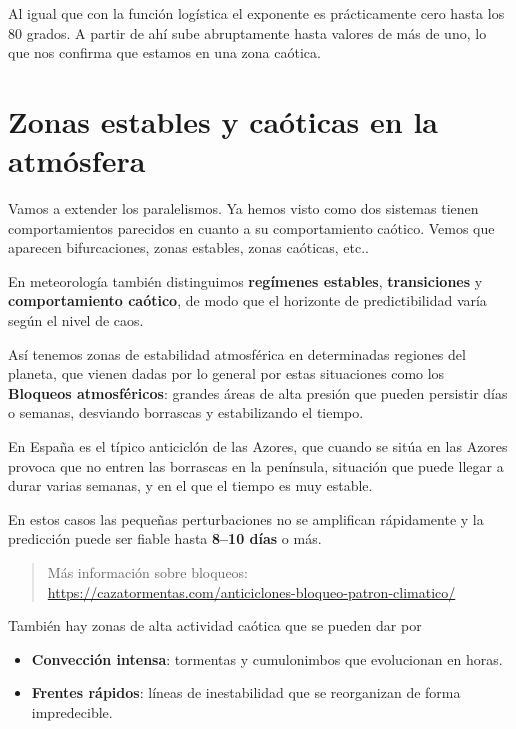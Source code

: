 \documentclass[
  10pt,
  a4paper,
  DIV=11,
  numbers=noendperiod,
  open=any]{scrreprt}
\providecommand{\tightlist}{%
  \setlength{\itemsep}{0pt}\setlength{\parskip}{0pt}}
\numberwithin{equation}{chapter}
\numberwithin{equation}{section}
\renewcommand{\[}{\begin{equation}}
\renewcommand{\]}{\end{equation}}
\begin{document}
Al igual que con la función logística el exponente es prácticamente cero
hasta los 80 grados. A partir de ahí sube abruptamente hasta valores de
más de uno, lo que nos confirma que estamos en una zona caótica.

\section{Zonas estables y caóticas en la
atmósfera}\label{zonas-estables-y-cauxf3ticas-en-la-atmuxf3sfera}

Vamos a extender los paralelismos. Ya hemos visto como dos sistemas
tienen comportamientos parecidos en cuanto a su comportamiento caótico.
Vemos que aparecen bifurcaciones, zonas estables, zonas caóticas, etc..

En meteorología también distinguimos \textbf{regímenes estables},
\textbf{transiciones} y \textbf{comportamiento caótico}, de modo que el
horizonte de predictibilidad varía según el nivel de caos.

Así tenemos zonas de estabilidad atmosférica en determinadas regiones
del planeta, que vienen dadas por lo general por estas situaciones como
los \textbf{Bloqueos atmosféricos}: grandes áreas de alta presión que
pueden persistir días o semanas, desviando borrascas y estabilizando el
tiempo.

En España es el típico anticiclón de las Azores, que cuando se sitúa en
las Azores provoca que no entren las borrascas en la península,
situación que puede llegar a durar varias semanas, y en el que el tiempo
es muy estable.

En estos casos las pequeñas perturbaciones no se amplifican rápidamente
y la predicción puede ser fiable hasta \textbf{8--10 días} o más.

\begin{quote}
Más información sobre bloqueos:\\
\url{https://cazatormentas.com/anticiclones-bloqueo-patron-climatico/}
\end{quote}

También hay zonas de alta actividad caótica que se pueden dar por

\begin{itemize}
\tightlist
\item
  \textbf{Convección intensa}: tormentas y cumulonimbos que evolucionan
  en horas.
\item
  \textbf{Frentes rápidos}: líneas de inestabilidad que se reorganizan
  de forma impredecible.
\end{itemize}
\end{document}
